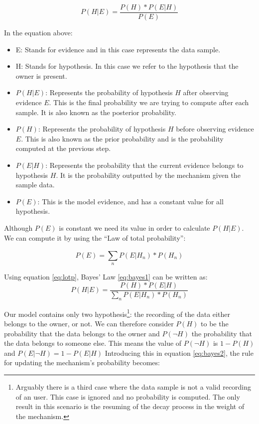\begin{equation} 
\label{eq:bayes1}
P(H|E) = \frac{P(H) * P(E|H)}{P(E)}
\end{equation}

In the equation above:
\begin{itemize} 
	\item E: Stands for evidence and in this case represents the data sample.
	\item H: Stands for hypothesis. In this case we refer to the hypothesis that the owner is present.
	\item $P(H|E)$: Represents the probability of hypothesis $H$ after observing evidence $E$. This is the final probability we are trying to compute after each sample. It is also known as the posterior probability. 
	\item $P(H)$: Represents the probability of hypothesis $H$ before observing evidence $E$. This is also known as the prior probability and is the probability computed at the previous step.
	\item $P(E|H)$: Represents the probability that the current evidence belongs to hypothesis $H$. It is the probability outputted by the mechanism given the sample data.
	\item $P(E)$: This is the model evidence, and has a constant value for all hypothesis.
\end{itemize}

Although $P(E)$ is constant we need its value in order to calculate $P(H|E)$. We can compute it by using the ``Law of total probability'':

\begin{equation} 
\label{eq:lotp}
P(E) = \sum_{n}^{}P(E|H_n) * P(H_n)
\end{equation}

Using equation \ref{eq:lotp}, Bayes' Law \ref{eq:bayes1} can be written as:
\begin{equation} 
\label{eq:bayes2}
P(H|E) = \frac{P(H) * P(E|H)}{\sum_{n}^{}P(E|H_n) * P(H_n)}
\end{equation}

Our model contains only two hypothesis\footnote{Arguably there is a third case where the data sample is not a valid recording of an user. This case is ignored and no probability is computed. The only result in this scenario is the resuming of the decay process in the weight of the mechanism.}: the recording of the data either belongs to the owner, or not. We can therefore consider $P(H)$ to be the probability that the data belongs to the owner and $P(\neg H)$ the probability that the data belongs to someone else. This means the value of $P(\neg H)$ is $1 - P(H)$ and $P(E|\neg H) = 1 - P(E|H)$ Introducing this in equation \ref{eq:bayes2}, the rule for updating the mechanism's probability becomes:

